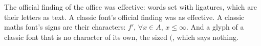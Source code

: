 The official finding of the office was effective: words set with
ligatures, which are their letters as text.
{\selectfont A classic font's official
finding was as effective.} A classic maths font's signs are their
characters: $f'$, $\forall x \in A$, $x \leq \infty$. And a glyph of a
classic font that is no character of its own, the sized $\bigl($,
which says nothing.
